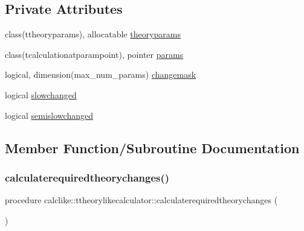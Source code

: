 \subsection*{Private Attributes}
\begin{DoxyCompactItemize}
\item 
class(ttheoryparams), allocatable \mbox{\hyperlink{structcalclike_1_1ttheorylikecalculator_ae77f5e599585341d394d2858bd046862}{theoryparams}}
\item 
class(tcalculationatparampoint), pointer \mbox{\hyperlink{structcalclike_1_1ttheorylikecalculator_a193c592892bab9ccdec45ea46a5df5c7}{params}}
\item 
logical, dimension(max\+\_\+num\+\_\+params) \mbox{\hyperlink{structcalclike_1_1ttheorylikecalculator_a75a4a33c83c3efe2c77f7e0a3c6b8b7b}{changemask}}
\item 
logical \mbox{\hyperlink{structcalclike_1_1ttheorylikecalculator_a91afa99bbd1a88856472240f0f11b9a9}{slowchanged}}
\item 
logical \mbox{\hyperlink{structcalclike_1_1ttheorylikecalculator_a94904357c47fcb457efd333b323a357b}{semislowchanged}}
\end{DoxyCompactItemize}


\subsection{Member Function/\+Subroutine Documentation}
\mbox{\label{structcalclike_1_1ttheorylikecalculator_a13a9f0107ef904796cac4ddd95a5b86d}} 
\subsubsection{\texorpdfstring{calculaterequiredtheorychanges()}{calculaterequiredtheorychanges()}}
{\footnotesize\ttfamily procedure calclike\+::ttheorylikecalculator\+::calculaterequiredtheorychanges (\begin{DoxyParamCaption}{ }\end{DoxyParamCaption})\hspace{0.3cm}{\ttfamily [private]}}

\mbox{\label{structcalclike_1_1ttheorylikecalculator_ab199ca08e527ebe3c59b847ad46c8a7f}} 
